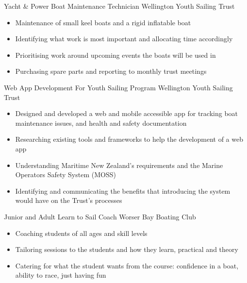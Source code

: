 \documentclass[a4paper]{twentysecondcv} %
\begin{document}
\begin{workexperience}
    {Yacht \& Power Boat Maintenance Technician}
    {Wellington Youth Sailing Trust}
    {
        \begin{itemize}
            \item Maintenance of small keel boats and a rigid inflatable boat
            \item Identifying what work is most important and allocating time accordingly
            \item Prioritising work around upcoming events the boats will be used in
            \item Purchasing spare parts and reporting to monthly trust meetings
        \end{itemize}
    }

    {Web App Development For Youth Sailing Program}
    {Wellington Youth Sailing Trust}
    {
        \begin{itemize}
            \item Designed and developed a web and mobile accessible app for tracking boat maintenance issues, and health and safety documentation
            \item Researching existing tools and frameworks to help the development of a web app
            \item Understanding Maritime New Zealand's requirements and the Marine Operators Safety System (MOSS)
            \item Identifying and communicating the benefits that introducing the system would have on the Trust's processes
        \end{itemize}
    }

    {Junior and Adult Learn to Sail Coach}
    {Worser Bay Boating Club}
    {
        \begin{itemize}
            \item Coaching students of all ages and skill levels
            \item Tailoring sessions to the students and how they learn, practical and theory
            \item Catering for what the student wants from the course: confidence in a boat, ability to race, just having fun
        \end{itemize}
    }

\end{workexperience}


\end{document}
